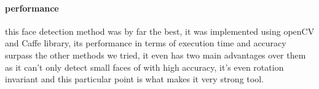 \paragraph{performance}
this face detection method was by far the best, it was implemented using openCV and Caffe library, its performance in terms of execution time and accuracy surpass the other methods we tried, it even has two main advantages over them as it can't only detect small faces of with high accuracy, it's even rotation invariant and this particular point is what makes it very strong tool.
